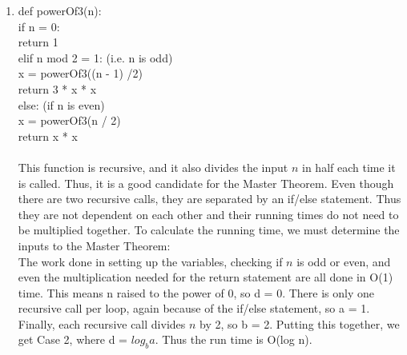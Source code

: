 \documentclass{article}
\begin{document}
\begin{enumerate}
\begin{enumerate}
        \item def powerOf3(n):\\
        \indent if n = 0:\\
        \indent \indent return 1\\
        \indent elif n mod 2 = 1: (i.e. n is odd)\\
        \indent \indent x = powerOf3((n - 1) /2)\\
        \indent \indent return 3 * x * x\\
        \indent else: (if n is even)\\
        \indent \indent x = powerOf3(n / 2)\\
        \indent \indent return x * x\\\\
        This function is recursive, and it also divides the input $n$ in half each time it is called. Thus, it is
        a good candidate for the Master Theorem. Even though there are two recursive calls, they are separated 
        by an if/else statement. Thus they are not dependent on each other and their running times do not need to be
        multiplied together. To calculate the running time, we must determine the inputs to the Master Theorem:\\
        The work done in setting up the variables, checking if $n$ is odd or even, and even the 
        multiplication needed for the return statement are all done in O(1) time. This means n raised to the power
        of 0, so d = 0. There is only one recursive call
        per loop, again because of the if/else statement, so a = 1. Finally, each recursive call divides $n$ by 2,
        so b = 2. Putting this together, we get Case 2, where d = $log_{b} a$. Thus the run time is O(log n).\\


\end{enumerate}
\end{enumerate}
\end{document}
